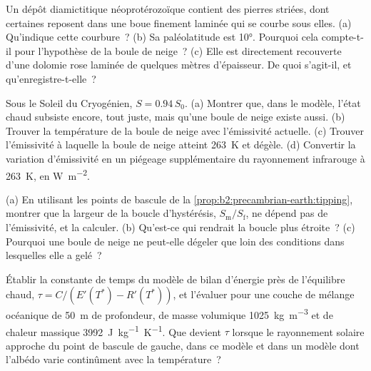 \begin{exercise}[$\star\star$]\label{exo:b2:precambrian-earth:9}
Un dépôt diamictitique néoprotérozoïque contient des pierres striées, dont certaines reposent dans une boue finement laminée
qui se courbe sous elles. (a) Qu'indique cette courbure~? (b) Sa paléolatitude est
\ang{10}. Pourquoi cela compte-t-il pour l'hypothèse de la boule de neige~? (c) Elle est directement recouverte d'une
dolomie rose laminée de quelques mètres d'épaisseur. De quoi s'agit-il, et qu'enregistre-t-elle~?
\end{exercise}

\begin{exercise}[$\star\star\star$]\label{exo:b2:precambrian-earth:10}
Sous le Soleil du Cryogénien, $S = 0.94\,S_0$. (a) Montrer que, dans le modèle, l'état chaud subsiste encore,
tout juste, mais qu'une boule de neige existe aussi. (b) Trouver la température de la boule de neige avec
l'émissivité actuelle. (c) Trouver l'émissivité à laquelle la boule de neige atteint \qty{263}{K} et dégèle. (d) Convertir
la variation d'émissivité en un piégeage supplémentaire du rayonnement infrarouge à
\qty{263}{K}, en \unit{W.m^{-2}}.
\end{exercise}

\begin{exercise}[$\star\star\star$]\label{exo:b2:precambrian-earth:11}
(a) En utilisant les points de bascule de la \cref{prop:b2:precambrian-earth:tipping}, montrer que la largeur
de la boucle d'hystérésis, $S_{\text{m}}/S_{\text{f}}$, ne dépend pas de l'émissivité, et la calculer. (b) Qu'est-ce qui
rendrait la boucle plus étroite~? (c) Pourquoi une boule de neige ne peut-elle dégeler que loin des
conditions dans lesquelles elle a gelé~?
\end{exercise}

\begin{exercise}[$\star\star\star$]\label{exo:b2:precambrian-earth:12}
Établir la constante de temps du modèle de bilan d'énergie près de l'équilibre chaud, $\tau =
C/(E'(T^*) - R'(T^*))$, et l'évaluer pour une couche de mélange océanique de \qty{50}{m} de profondeur, de masse volumique
\qty{1025}{kg.m^{-3}} et de chaleur massique \qty{3992}{J.kg^{-1}.K^{-1}}. Que devient $\tau$ lorsque le
rayonnement solaire approche du point de bascule de gauche, dans ce modèle et dans un modèle dont l'albédo varie
continûment avec la température~?
\end{exercise}

